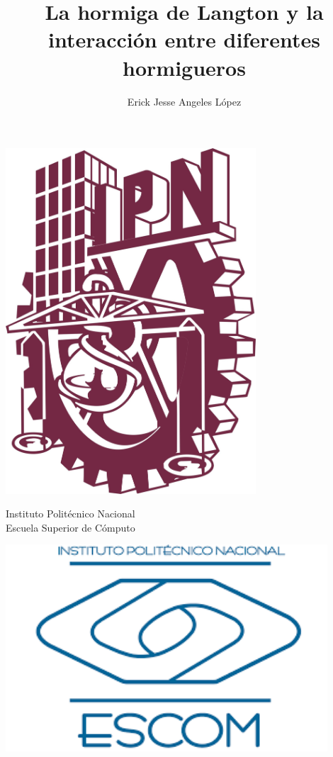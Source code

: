 \documentclass[12pt,twoside]{article}
\title{La hormiga de Langton y la interacción entre diferentes hormigueros}
\author{Erick Jesse Angeles López}
\date{}
\begin{document}
	
	\begin{center}
		
		\begin{minipage}{0.17\textwidth}
			\centering
			\includegraphics[width=0.7\textwidth]{img/ipn_logo.jpg} %
		\end{minipage}
		\begin{minipage}{.55\textwidth}
			\centering
			{\Large Instituto Politécnico Nacional}\\
			{\Large Escuela Superior de Cómputo}
		\end{minipage}
		\begin{minipage}{0.17\textwidth}
			\centering
			\includegraphics[width=0.9\textwidth]{img/escom_logo} %
		\end{minipage}			
	\end{center}
	
\end{document}
